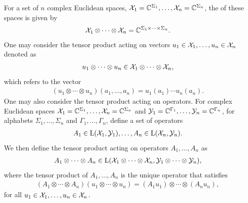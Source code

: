 For a set of $n$ complex Euclidean spaces, $\mathcal{X}_1 = \mathbb{C}^{\Sigma_1}, \ldots, \mathcal{X}_n = \mathbb{C}^{\Sigma_n}$, the  of these spaces is given by
\begin{align}
	\mathcal{X}_1 \otimes \cdots \otimes \mathcal{X}_n = \mathbb{C}^{\Sigma_1 \times \cdots \times \Sigma_n}.
\end{align}
One may consider the tensor product acting on vectors $u_1 \in \mathcal{X}_1, \ldots, u_n \in \mathcal{X}_n$ denoted as 
\begin{align}
	u_1 \otimes \cdots \otimes u_n \in \mathcal{X}_1 \otimes \cdots \otimes \mathcal{X}_n,
\end{align}
which refers to the vector 
\begin{align}
	\left( u_1 \otimes \cdots \otimes u_n \right) \left( a_1, \ldots, a_n \right) = u_1(a_1) \cdots u_n(a_n).
\end{align}
One may also consider the tensor product acting on operators. For complex Euclidean spaces $\mathcal{X}_1 = \mathbb{C}^{\Sigma_1}, \ldots, \mathcal{X}_n = \mathbb{C}^{\Sigma_n}$ and $\mathcal{Y}_1 = \mathbb{C}^{\Gamma_1}, \ldots, \mathcal{Y}_n = \mathbb{C}^{\Gamma_n}$, for alphabets $\Sigma_1, \ldots, \Sigma_n$ and $\Gamma_1, \ldots, \Gamma_n$, define a set of operators 
\begin{align}
	A_1 \in \mathrm{L}(\mathcal{X}_1,\mathcal{Y}_1), \ldots, A_n \in \mathrm{L}(\mathcal{X}_n,\mathcal{Y}_n).
\end{align} 
We then define the tensor product acting on operators $A_1, \ldots, A_n$ as 
\begin{align} \label{eq:A-operators}
	A_1 \otimes \cdots \otimes A_n \in \mathrm{L}(\mathcal{X}_1 \otimes \cdots \otimes \mathcal{X}_n, \mathcal{Y}_1 \otimes \cdots \otimes \mathcal{Y}_n),
\end{align}
where the tensor product of $A_1, \ldots, A_n$ is the unique operator that satisfies 
\begin{align}
	\left(A_1 \otimes \cdots \otimes A_n \right) \left( u_1 \otimes \cdots \otimes u_n \right) = \left(A_1 u_1 \right) \otimes \cdots \otimes \left( A_n u_n \right),
\end{align}
for all $u_1 \in \mathcal{X}_1, \ldots, u_n \in \mathcal{X}_n$. 

